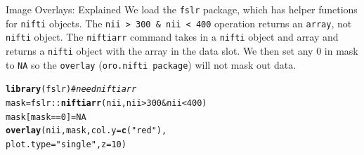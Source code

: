 \documentclass[11pt]{beamer}\usepackage[]{graphicx}\usepackage[]{color}
\makeatletter
\newcommand{\hlnum}[1]{\textcolor[rgb]{0.686,0.059,0.569}{#1}}%
\newcommand{\hlstr}[1]{\textcolor[rgb]{0.192,0.494,0.8}{#1}}%
\newcommand{\hlcom}[1]{\textcolor[rgb]{0.678,0.584,0.686}{\textit{#1}}}%
\newcommand{\hlopt}[1]{\textcolor[rgb]{0,0,0}{#1}}%
\newcommand{\hlstd}[1]{\textcolor[rgb]{0.345,0.345,0.345}{#1}}%
\newcommand{\hlkwb}[1]{\textcolor[rgb]{0.69,0.353,0.396}{#1}}%
\newcommand{\hlkwc}[1]{\textcolor[rgb]{0.333,0.667,0.333}{#1}}%
\newcommand{\hlkwd}[1]{\textcolor[rgb]{0.737,0.353,0.396}{\textbf{#1}}}%
\newenvironment{kframe}{%
 \def\at@end@of@kframe{}%
 \ifinner\ifhmode%
  \def\at@end@of@kframe{\end{minipage}}%
  \begin{minipage}{\columnwidth}%
 \fi\fi%
 \def\FrameCommand##1{\hskip\@totalleftmargin \hskip-\fboxsep
 \colorbox{shadecolor}{##1}\hskip-\fboxsep
     \hskip-\linewidth \hskip-\@totalleftmargin \hskip\columnwidth}%
 \MakeFramed {\advance\hsize-\width
   \@totalleftmargin\z@ \linewidth\hsize
   \@setminipage}}%
 {\par\unskip\endMakeFramed%
 \at@end@of@kframe}
\newenvironment{knitrout}{}{} %
\makeatother
\begin{document}
\begin{frame}[fragile]{Image Overlays: Explained}
We load the \verb|fslr| package, which has helper functions for \verb|nifti| objects.  The \verb|nii > 300 & nii < 400| operation returns an \verb|array|, not \verb|nifti| object.  The \verb|niftiarr| command takes in a \verb|nifti| object and array and returns a \verb|nifti| object with the array in the data slot.  We then set any $0$ in mask to \verb|NA| so the \verb|overlay| (\verb|oro.nifti package|) will not mask out data.
\begin{center}
\begin{knitrout}
\color{fgcolor}\begin{kframe}
\begin{alltt}
\hlkwd{library}\hlstd{(fslr)} \hlcom{# need niftiarr}
\hlstd{mask} \hlkwb{=} \hlstd{fslr}\hlopt{::}\hlkwd{niftiarr}\hlstd{(nii, nii} \hlopt{>} \hlnum{300} \hlopt{&} \hlstd{nii} \hlopt{<} \hlnum{400}\hlstd{)}
\hlstd{mask[mask} \hlopt{==} \hlnum{0}\hlstd{]} \hlkwb{=} \hlnum{NA}
\hlkwd{overlay}\hlstd{(nii, mask,} \hlkwc{col.y}\hlstd{=} \hlkwd{c}\hlstd{(}\hlstr{"red"}\hlstd{),}
        \hlkwc{plot.type}\hlstd{=}\hlstr{"single"}\hlstd{,} \hlkwc{z} \hlstd{=} \hlnum{10}\hlstd{)}
\end{alltt}
\end{kframe}
\end{knitrout}
\end{center}

\end{frame}
\end{document}
